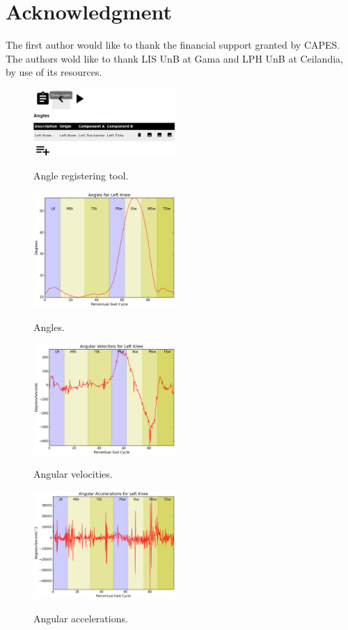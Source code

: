 \documentclass[journal]{IEEEtran}
\begin{document}
\section*{Acknowledgment}

The first author would like to thank the financial support granted by CAPES.
The authors wold like to thank LIS UnB at Gama and LPH UnB at Ceilandia,
by use of its resources.

\begin{figure}[!t]
	\centering
	{\includegraphics[width=0.48\textwidth]{./angles_tool.eps}}
	\caption{Angle registering tool.}
	\label{angles_tool}
\end{figure}
\begin{figure}[!t]
	\centering
	{\includegraphics[width=0.48\textwidth]{./angles.eps}}
	\caption{Angles.}
	\label{angles}
\end{figure}
\begin{figure}[!t]
	\centering
	{\includegraphics[width=0.48\textwidth]{./av.eps}}
	\caption{Angular velocities.}
	\label{av}
\end{figure}
\begin{figure}[!t]
	\centering
	{\includegraphics[width=0.48\textwidth]{./aa.eps}}
	\caption{Angular accelerations.}
	\label{aa}
\end{figure}
\end{document}
